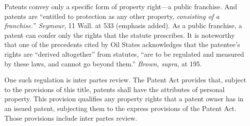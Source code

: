 Patents convey only a specific form of property right---a public franchise.
And patents are ``entitled to
protection as any other property, \textit{consisting of a franchise.}''
\textit{Seymour}, 11 Wall. at 533 (emphasis added). As a public franchise, a
patent can confer only the rights that the statute prescribes.
It is noteworthy that one of
the precedents cited by Oil States acknowledges that the patentee's rights are
``derived altogether'' from statutes, ``are to be regulated and measured by
these laws, and cannot go beyond them.'' \textit{Brown, supra}, at
195.

One such regulation is inter partes review.
The Patent Act provides that, subject to the
provisions of this title, patents shall have the attributes of personal
property. This provision qualifies any property rights that
a patent owner has in an issued patent, subjecting them to the express
provisions of the Patent Act. Those provisions
include inter partes review.

